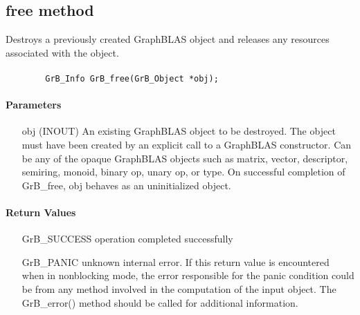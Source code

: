 \subsection{{\sf free} method}

Destroys a previously created GraphBLAS object and releases any resources associated with the object.

\paragraph{\syntax}

\begin{verbatim}
        GrB_Info GrB_free(GrB_Object *obj);
\end{verbatim}


\paragraph{Parameters}

\begin{itemize}[leftmargin=1.1in]
	\item[{\sf obj}] ({\sf INOUT}) An existing GraphBLAS object to be destroyed. 
		The object must have been created by an explicit call to a GraphBLAS constructor.
    Can be any of the opaque GraphBLAS objects such as matrix, vector, descriptor, semiring, monoid, binary op, 
		unary op, or type. On successful completion of {\sf GrB\_free}, {\sf obj} behaves as an uninitialized object.
\end{itemize}

\paragraph{Return Values}

\begin{itemize}[leftmargin=2.1in]
\item[{\sf GrB\_SUCCESS}]        operation completed successfully
\item[{\sf GrB\_PANIC}]          unknown internal error.  If this return
value is encountered when in nonblocking mode, the error responsible for
the panic condition could be from any method involved in the computation
of the input object.  The {\sf GrB\_error()} method should be called
for additional information.
\end{itemize}

